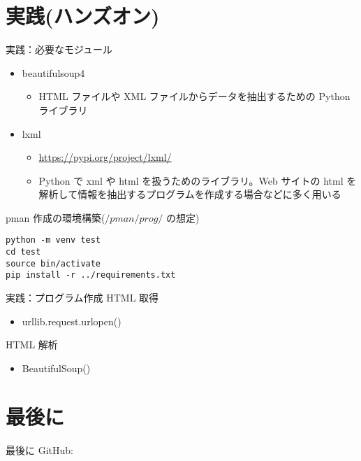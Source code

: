 \documentclass[compress,dvipdfmx,11pt]{beamer}
\begin{document}
\section{実践(ハンズオン)}
\label{sec:orga410a29}
\begin{frame}[label={sec:org0be2311},fragile]{実践：必要なモジュール}
 \begin{itemize}
\item beautifulsoup4
\begin{itemize}
\item HTML ファイルや XML ファイルからデータを抽出するための Python ライブラリ
\end{itemize}
\item lxml
\begin{itemize}
\item \url{https://pypi.org/project/lxml/}
\item Python で xml や html を扱うためのライブラリ。Web サイトの html を
解析して情報を抽出するプログラムを作成する場合などに多く用いる
\end{itemize}
\end{itemize}

pman 作成の環境構築(\(/pman/prog/\) の想定)
\begin{verbatim}
python -m venv test
cd test
source bin/activate
pip install -r ../requirements.txt
\end{verbatim}
\end{frame}

\begin{frame}[label={sec:org6286c03}]{実践：プログラム作成}
HTML 取得
\begin{itemize}
\item urllib.request.urlopen()
\end{itemize}


HTML 解析
\begin{itemize}
\item BeautifulSoup()
\end{itemize}
\end{frame}

\section{最後に}
\label{sec:org7907de8}
\begin{frame}[label={sec:orgb506614}]{最後に}
GitHub: 
\end{frame}
\end{document}
